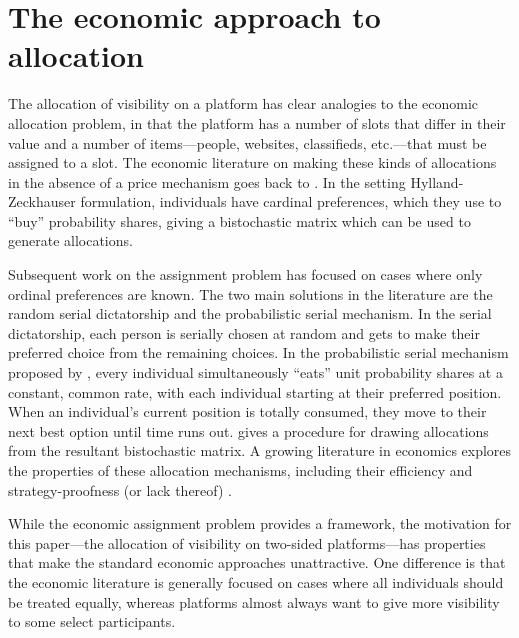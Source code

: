 \section{The economic approach to allocation} 
The allocation of visibility on a platform has clear analogies to the
economic allocation problem, in that the platform has a number of
slots that differ in their value and a number of items---people,
websites, classifieds, etc.---that must be assigned to a slot. The
economic literature on making these kinds of allocations in the
absence of a price mechanism goes back to
\cite{hylland1979efficient}. In the setting Hylland-Zeckhauser
formulation, individuals have cardinal preferences, which they use to
``buy'' probability shares, giving a bistochastic matrix which can be
used to generate allocations.

Subsequent work on the assignment problem has focused on cases where
only ordinal preferences are known. The two main solutions in the
literature are the random serial dictatorship and the probabilistic
serial mechanism. In the serial dictatorship, each person is serially
chosen at random and gets to make their preferred choice from the
remaining choices. In the probabilistic serial mechanism proposed by
\cite{bogomolnaia2001new}, every individual simultaneously ``eats''
unit probability shares at a constant, common rate, with each
individual starting at their preferred position. When an individual's
current position is totally consumed, they move to their next best
option until time runs out. \cite{budish2009implementing} gives a
procedure for drawing allocations from the resultant bistochastic
matrix. A growing literature in economics explores the properties of
these allocation mechanisms, including their efficiency and
strategy-proofness (or lack thereof)
\cite{kojima2010incentives,manea2007serial,abdulkadiroglu1999house}.

While the economic assignment problem provides a framework, the
motivation for this paper---the allocation of visibility on two-sided
platforms---has properties that make the standard economic approaches
unattractive. One difference is that the economic literature is
generally focused on cases where all individuals should be treated
equally, whereas platforms almost always want to give more visibility
to some select participants.

